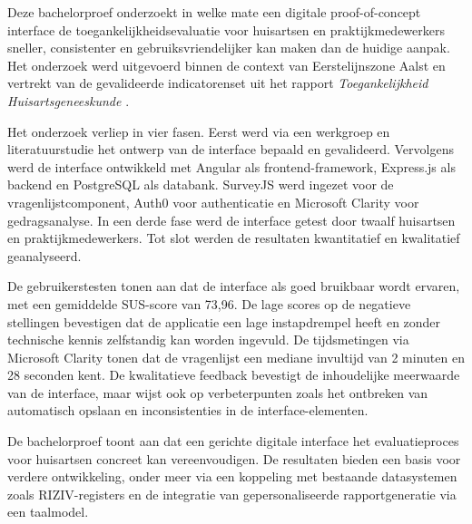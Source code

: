 Deze bachelorproef onderzoekt in welke mate een digitale proof-of-concept interface de toegankelijkheidsevaluatie voor huisartsen en praktijkmedewerkers sneller, consistenter en gebruiksvriendelijker kan maken dan de huidige aanpak. 
Het onderzoek werd uitgevoerd binnen de context van Eerstelijnszone Aalst en vertrekt van de gevalideerde indicatorenset uit het rapport \textit{Toegankelijkheid Huisartsgeneeskunde} \autocite{Merckx2023}.
\medskip

Het onderzoek verliep in vier fasen. 
Eerst werd via een werkgroep en literatuurstudie het ontwerp van de interface bepaald en gevalideerd. 
Vervolgens werd de interface ontwikkeld met Angular als frontend-framework, Express.js als backend en PostgreSQL als databank. 
SurveyJS werd ingezet voor de vragenlijstcomponent, Auth0 voor authenticatie en Microsoft Clarity voor gedragsanalyse. 
In een derde fase werd de interface getest door twaalf huisartsen en praktijkmedewerkers. 
Tot slot werden de resultaten kwantitatief en kwalitatief geanalyseerd.
\medskip

De gebruikerstesten tonen aan dat de interface als goed bruikbaar wordt ervaren, met een gemiddelde SUS-score van 73,96. 
De lage scores op de negatieve stellingen bevestigen dat de applicatie een lage instapdrempel heeft en zonder technische kennis zelfstandig kan worden ingevuld. 
De tijdsmetingen via Microsoft Clarity tonen dat de vragenlijst een mediane invultijd van 2 minuten en 28 seconden kent. 
De kwalitatieve feedback bevestigt de inhoudelijke meerwaarde van de interface, maar wijst ook op verbeterpunten zoals het ontbreken van automatisch opslaan en inconsistenties in de interface-elementen.
\medskip

De bachelorproef toont aan dat een gerichte digitale interface het evaluatieproces voor huisartsen concreet kan vereenvoudigen. 
De resultaten bieden een basis voor verdere ontwikkeling, onder meer via een koppeling met bestaande datasystemen zoals RIZIV-registers en de integratie van gepersonaliseerde rapportgeneratie via een taalmodel.
